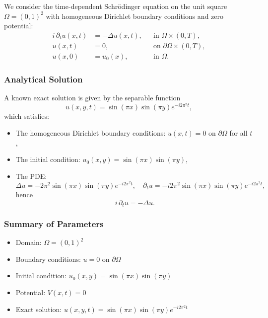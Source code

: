 \documentclass{article}
\theoremstyle{definition}
\theoremstyle{plain}
\theoremstyle{remark}
\begin{document}
We consider the time-dependent Schrödinger equation on the unit square $\Omega = (0,1)^2$ with homogeneous Dirichlet boundary conditions and zero potential:
\begin{align*}
i \, \partial_t u(x,t) &= -\Delta u(x,t), &&\text{in } \Omega \times (0,T), \\
u(x,t) &= 0, &&\text{on } \partial \Omega \times (0,T), \\
u(x,0) &= u_0(x), &&\text{in } \Omega.
\end{align*}

\subsubsection*{Analytical Solution}

A known exact solution is given by the separable function
\[
u(x,y,t) = \sin(\pi x)\sin(\pi y) e^{-i 2\pi^2 t},
\]
which satisfies:
\begin{itemize}
  \item The homogeneous Dirichlet boundary conditions: $u(x,t) = 0$ on $\partial \Omega$ for all $t$,
  \item The initial condition: $u_0(x,y) = \sin(\pi x)\sin(\pi y)$,
  \item The PDE:
  \[
  \Delta u = -2\pi^2 \sin(\pi x)\sin(\pi y) e^{-i 2\pi^2 t}, \quad
  \partial_t u = -i 2\pi^2 \sin(\pi x)\sin(\pi y) e^{-i 2\pi^2 t},
  \]
  hence
  \[
  i \, \partial_t u = -\Delta u.
  \]
\end{itemize}

\subsubsection*{Summary of Parameters}
\begin{itemize}
  \item Domain: $\Omega = (0,1)^2$
  \item Boundary conditions: $u = 0$ on $\partial \Omega$
  \item Initial condition: $u_0(x,y) = \sin(\pi x)\sin(\pi y)$
  \item Potential: $V(x,t) = 0$
  \item Exact solution: $u(x,y,t) = \sin(\pi x)\sin(\pi y) e^{-i 2\pi^2 t}$
\end{itemize}
\end{document}
